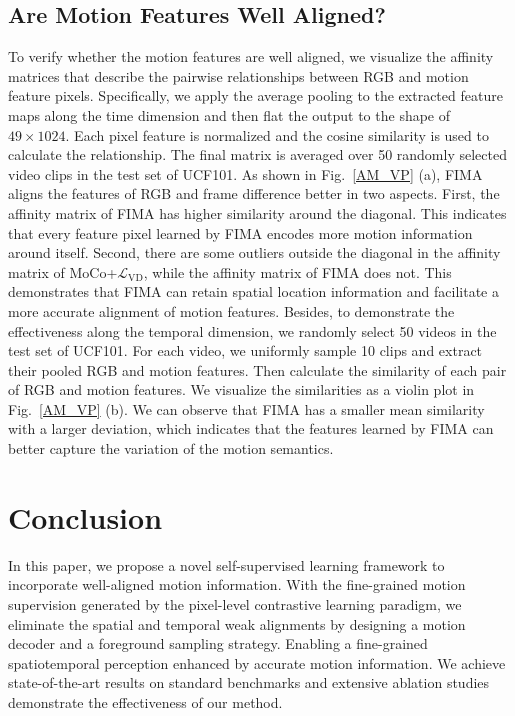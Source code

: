 \documentclass[sigconf,screen]{acmart}
\begin{document}
\subsection{Are Motion Features Well Aligned?} 
To verify whether the motion features are well aligned, we visualize the affinity matrices that describe the pairwise relationships between RGB and motion feature pixels. Specifically, we apply the average pooling to the extracted feature maps along the time dimension and then flat the output to the shape of $49 \times 1024$. Each pixel feature is normalized and the cosine similarity is used to calculate the relationship. The final matrix is averaged over 50 randomly selected video clips in the test set of UCF101. As shown in Fig.~\ref{AM_VP} (a), FIMA aligns the features of RGB and frame difference better in two aspects. First, the affinity matrix of FIMA has higher similarity around the diagonal. This indicates that every feature pixel learned by FIMA encodes more motion information around itself. Second, there are some outliers outside the diagonal in the affinity matrix of MoCo+$\mathcal{L}_{\mathrm{VD}}$, while the affinity matrix of FIMA does not. This demonstrates that FIMA can retain spatial location information and facilitate a more accurate alignment of motion features. Besides, to demonstrate the effectiveness along the temporal dimension, we randomly select 50 videos in the test set of UCF101. For each video, we uniformly sample 10 clips and extract their pooled RGB and motion features. Then calculate the similarity of each pair of RGB and motion features. We visualize the similarities as a violin plot in Fig.~\ref{AM_VP} (b). We can observe that FIMA has a smaller mean similarity with a larger deviation, which indicates that the features learned by FIMA can better capture the variation of the motion semantics.

\section{Conclusion}
In this paper, we propose a novel self-supervised learning framework to incorporate well-aligned motion information. With the fine-grained motion supervision generated by the pixel-level contrastive learning paradigm, we eliminate the spatial and temporal weak alignments by designing a motion decoder and a foreground sampling strategy. Enabling a fine-grained spatiotemporal perception enhanced by accurate motion information. We achieve state-of-the-art results on standard benchmarks and extensive ablation studies demonstrate the effectiveness of our method.
\end{document}
